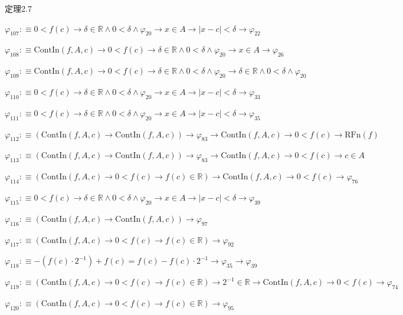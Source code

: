 \begin{fullproof}{定理2.7}
\begin{abbrevlist}
\item $\varphi_{107} :\equiv 0 < f(c) \to \delta \in \mathbb{R} \land 0 < \delta \land \varphi_{20} \to x \in A \to \lvert x - c \rvert < \delta \to \varphi_{22}$
\item $\varphi_{108} :\equiv \mathrm{ContIn}(f,A,c) \to 0 < f(c) \to \delta \in \mathbb{R} \land 0 < \delta \land \varphi_{20} \to x \in A \to \varphi_{26}$
\item $\varphi_{109} :\equiv \mathrm{ContIn}(f,A,c) \to 0 < f(c) \to \delta \in \mathbb{R} \land 0 < \delta \land \varphi_{20} \to \delta \in \mathbb{R} \land 0 < \delta \land \varphi_{20}$
\item $\varphi_{110} :\equiv 0 < f(c) \to \delta \in \mathbb{R} \land 0 < \delta \land \varphi_{20} \to x \in A \to \lvert x - c \rvert < \delta \to \varphi_{33}$
\item $\varphi_{111} :\equiv 0 < f(c) \to \delta \in \mathbb{R} \land 0 < \delta \land \varphi_{20} \to x \in A \to \lvert x - c \rvert < \delta \to \varphi_{35}$
\item $\varphi_{112} :\equiv (\mathrm{ContIn}(f,A,c) \to \mathrm{ContIn}(f,A,c)) \to \varphi_{83} \to \mathrm{ContIn}(f,A,c) \to 0 < f(c) \to \mathrm{RFn}(f)$
\item $\varphi_{113} :\equiv (\mathrm{ContIn}(f,A,c) \to \mathrm{ContIn}(f,A,c)) \to \varphi_{83} \to \mathrm{ContIn}(f,A,c) \to 0 < f(c) \to c \in A$
\item $\varphi_{114} :\equiv (\mathrm{ContIn}(f,A,c) \to 0 < f(c) \to f(c) \in \mathbb{R}) \to \mathrm{ContIn}(f,A,c) \to 0 < f(c) \to \varphi_{76}$
\item $\varphi_{115} :\equiv 0 < f(c) \to \delta \in \mathbb{R} \land 0 < \delta \land \varphi_{20} \to x \in A \to \lvert x - c \rvert < \delta \to \varphi_{39}$
\item $\varphi_{116} :\equiv (\mathrm{ContIn}(f,A,c) \to \mathrm{ContIn}(f,A,c)) \to \varphi_{97}$
\item $\varphi_{117} :\equiv (\mathrm{ContIn}(f,A,c) \to 0 < f(c) \to f(c) \in \mathbb{R}) \to \varphi_{92}$
\item $\varphi_{118} :\equiv -(f(c) \cdot 2^{-1}) + f(c) = f(c) - f(c) \cdot 2^{-1} \to \varphi_{35} \to \varphi_{39}$
\item $\varphi_{119} :\equiv (\mathrm{ContIn}(f,A,c) \to 0 < f(c) \to f(c) \in \mathbb{R}) \to 2^{-1} \in \mathbb{R} \to \mathrm{ContIn}(f,A,c) \to 0 < f(c) \to \varphi_{74}$
\item $\varphi_{120} :\equiv (\mathrm{ContIn}(f,A,c) \to 0 < f(c) \to f(c) \in \mathbb{R}) \to \varphi_{95}$

\end{abbrevlist}
\end{fullproof}
